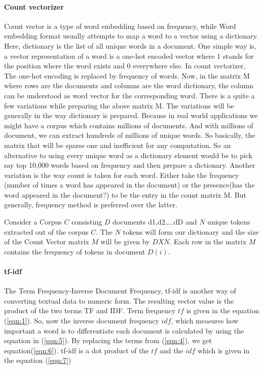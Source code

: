 \paragraph{Count vectorizer}
Count vector is a type of word embedding based on frequency, while Word embedding format usually attempts to map a word to a vector using a dictionary. Here, dictionary is the list of all unique words in a document. One simple way is, a vector representation of a word is a one-hot encoded vector where 1 stands for the position where the word exists and 0 everywhere else. In count vectorizer, The one-hot encoding is replaced by  frequency of words. Now, in the matrix M where rows are the documents and columns are the word dictionary, the column can be understood as word vector for the corresponding word. There is a quite a few variations while preparing the above matrix M. The variations will be generally in the way dictionary is prepared.
Because in real world applications we might have a corpus which contains millions of documents. And with millions of document, we can extract hundreds of millions of unique words. So basically, the matrix that will be sparse one and inefficient for any computation. So an alternative to using every unique word as a dictionary element would be to pick say top 10,000 words based on frequency and then prepare a dictionary. Another variation is the way count is taken for each word. Either take the frequency (number of times a word has appeared in the document) or the presence(has the word appeared in the document?) to be the entry in the count matrix M. But generally, frequency method is preferred over the latter.

Consider a Corpus $C$ consisting $D$ documents {d1,d2…..dD} and $N$ unique tokens extracted out of the corpus $C$. The $N$ tokens will form our dictionary and the size of the Count Vector matrix $M$ will be given by $D X N$. Each row in the matrix $M$ contains the frequency of tokens in document $D(i)$.

\paragraph{tf-idf}
The Term Frequency-Inverse Document Frequency, tf-idf is another way of converting textual data to numeric form. The resulting vector value is the product of the two terms TF and IDF. Term frequency $tf$ is given in the equation (\ref{eqn:1}). So, now the inverse document frequency $idf$, which measures how important a word is to differentiate each document is calculated by using the equation in (\ref{eqn:5}). By replacing the terms from (\ref{eqn:4}), we get equation(\ref{eqn:6}). tf-idf is a dot product of the $tf$ and the $idf$ which is given in the equation (\ref{eqn:7})

